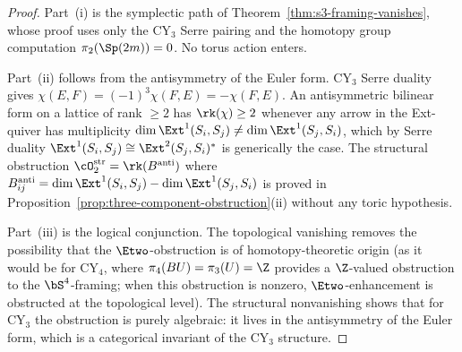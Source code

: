\begin{proof}
Part~(i) is the symplectic path of Theorem~\ref{thm:s3-framing-vanishes}, whose proof uses only the CY$_3$ Serre pairing and the homotopy group computation $\pi_2(\Sp(2m)) = 0$. No torus action enters.

Part~(ii) follows from the antisymmetry of the Euler form. CY$_3$ Serre duality gives $\chi(E, F) = (-1)^3 \chi(F, E) = -\chi(F, E)$. An antisymmetric bilinear form on a lattice of rank $\geq 2$ has $\rk(\chi) \geq 2$ whenever any arrow in the Ext-quiver has multiplicity $\dim \Ext^1(S_i, S_j) \neq \dim \Ext^1(S_j, S_i)$, which by Serre duality $\Ext^1(S_i, S_j) \cong \Ext^2(S_j, S_i)^*$ is generically the case. The structural obstruction $\cO_2^{\mathrm{str}} = \rk(B^{\mathrm{anti}})$ where $B^{\mathrm{anti}}_{ij} = \dim \Ext^1(S_i, S_j) - \dim \Ext^1(S_j, S_i)$ is proved in Proposition~\ref{prop:three-component-obstruction}(ii) without any toric hypothesis.

Part~(iii) is the logical conjunction. The topological vanishing removes the possibility that the $\Etwo$-obstruction is of homotopy-theoretic origin (as it would be for CY$_4$, where $\pi_4(BU) = \pi_3(U) = \Z$ provides a $\Z$-valued obstruction to the $\bS^4$-framing; when this obstruction is nonzero, $\Etwo$-enhancement is obstructed at the topological level). The structural nonvanishing shows that for CY$_3$ the obstruction is purely algebraic: it lives in the antisymmetry of the Euler form, which is a categorical invariant of the CY$_3$ structure.
\end{proof}

